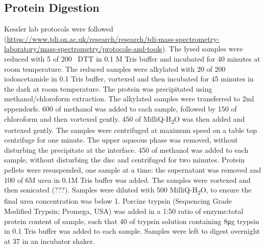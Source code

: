 \subsection{Protein Digestion}
Kessler lab protocols were followed (\url{https://www.tdi.ox.ac.uk/research/research/tdi-mass-spectrometry-laboratory/mass-spectrometry/protocols-and-tools}).
The lysed samples were reduced with 5\ul{} of 200\si{\milli\Molar} DTT in 0.1 M Tris buffer and incubated for 40 minutes at room temperature.
The reduced samples were alkylated with 20\ul{} of 200\si{\milli\Molar} iodoacetamide in 0.1\si{\Molar} Tris buffer, vortexed and then incubated for 45 minutes in the dark at room temperature.
The protein was precipitated using methanol/chloroform extraction.
The alkylated samples were transferred to 2ml eppendorfs.
600\ul{} of methanol was added to each sample, followed by 150\ul{} of chloroform and then vortexed gently.
450\ul{} of MilliQ-H\textsubscript{2}O was then added and vortexed gently.
The samples were centrifuged at maximum speed on a table top centrifuge for one minute.
The upper aqueous phase was removed, without disturbing the precipitate at the interface.
450\ul{} of methanol was added to each sample, without disturbing the disc and centrifuged for two minutes.
Protein pellets were resuspended, one sample at a time: the supernatant was removed and 100\ul{} of 6M urea in 0.1M Tris buffer was added.
The samples were vortexed and then sonicated (???).
Samples were diluted with 500\ul{} MilliQ-H\textsubscript{2}O, to ensure the final urea concentration was below 1\si{\Molar}.
Porcine trypsin (Sequencing Grade Modified Trypsin; Promega, USA) was added in a 1:50 ratio of enzyme:total protein content of sample, such that 40\ul{} of trypsin solution containing 8\si{\ug} trypsin in 0.1\si{\Molar} Tris buffer was added to each sample.
Samples were left to digest overnight at 37\C{} in an incubator shaker.

